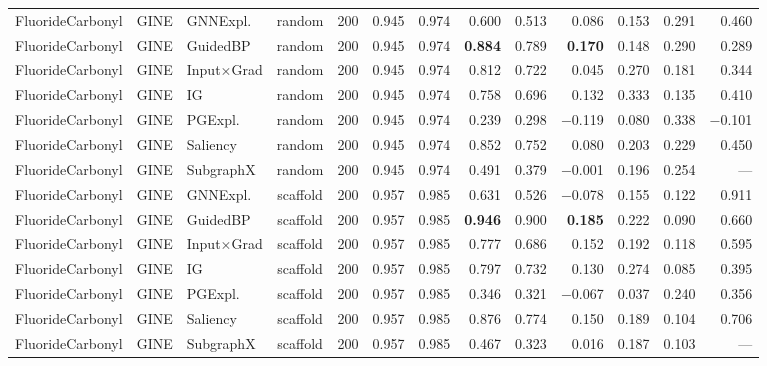 \begin{table}[t]
{\begin{tabular}{lllcrrrrrrrrr}
\addlinespace[2pt]
FluorideCarbonyl & GINE & GNNExpl. & random & 200 & 0.945 & 0.974 & 0.600 & 0.513 & 0.086 & 0.153 & 0.291 & 0.460 \\
FluorideCarbonyl & GINE & GuidedBP & random & 200 & 0.945 & 0.974 & \textbf{0.884} & 0.789 & \textbf{0.170} & 0.148 & 0.290 & 0.289 \\
FluorideCarbonyl & GINE & Input$\times$Grad & random & 200 & 0.945 & 0.974 & 0.812 & 0.722 & 0.045 & 0.270 & 0.181 & 0.344 \\
FluorideCarbonyl & GINE & IG & random & 200 & 0.945 & 0.974 & 0.758 & 0.696 & 0.132 & 0.333 & 0.135 & 0.410 \\
FluorideCarbonyl & GINE & PGExpl. & random & 200 & 0.945 & 0.974 & 0.239 & 0.298 & $-$0.119 & 0.080 & 0.338 & $-$0.101 \\
FluorideCarbonyl & GINE & Saliency & random & 200 & 0.945 & 0.974 & 0.852 & 0.752 & 0.080 & 0.203 & 0.229 & 0.450 \\
FluorideCarbonyl & GINE & SubgraphX & random & 200 & 0.945 & 0.974 & 0.491 & 0.379 & $-$0.001 & 0.196 & 0.254 & --- \\
\addlinespace[2pt]
FluorideCarbonyl & GINE & GNNExpl. & scaffold & 200 & 0.957 & 0.985 & 0.631 & 0.526 & $-$0.078 & 0.155 & 0.122 & 0.911 \\
FluorideCarbonyl & GINE & GuidedBP & scaffold & 200 & 0.957 & 0.985 & \textbf{0.946} & 0.900 & \textbf{0.185} & 0.222 & 0.090 & 0.660 \\
FluorideCarbonyl & GINE & Input$\times$Grad & scaffold & 200 & 0.957 & 0.985 & 0.777 & 0.686 & 0.152 & 0.192 & 0.118 & 0.595 \\
FluorideCarbonyl & GINE & IG & scaffold & 200 & 0.957 & 0.985 & 0.797 & 0.732 & 0.130 & 0.274 & 0.085 & 0.395 \\
FluorideCarbonyl & GINE & PGExpl. & scaffold & 200 & 0.957 & 0.985 & 0.346 & 0.321 & $-$0.067 & 0.037 & 0.240 & 0.356 \\
FluorideCarbonyl & GINE & Saliency & scaffold & 200 & 0.957 & 0.985 & 0.876 & 0.774 & 0.150 & 0.189 & 0.104 & 0.706 \\
FluorideCarbonyl & GINE & SubgraphX & scaffold & 200 & 0.957 & 0.985 & 0.467 & 0.323 & 0.016 & 0.187 & 0.103 & --- \\
\bottomrule
\end{tabular}}
\end{table}

